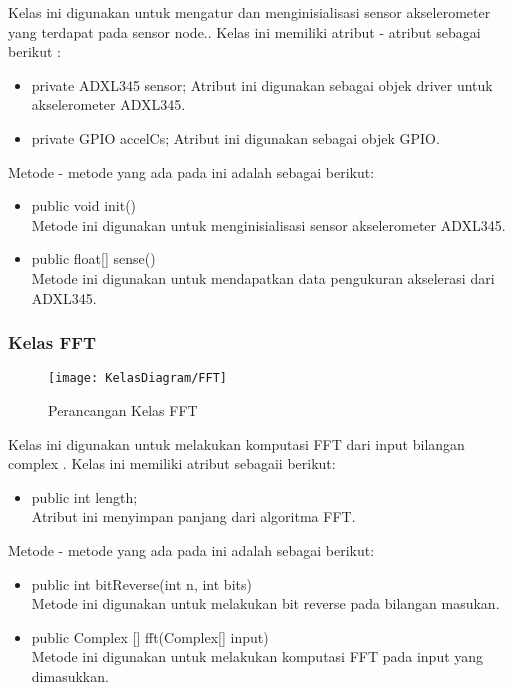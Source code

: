 Kelas ini digunakan untuk mengatur dan menginisialisasi sensor akselerometer yang terdapat pada sensor node.. Kelas ini memiliki atribut - atribut sebagai berikut :
\begin{itemize}
	\item private ADXL345 sensor;
		Atribut ini digunakan sebagai objek driver untuk akselerometer ADXL345.
	\item private GPIO accelCs;
		Atribut ini digunakan sebagai objek GPIO.
\end{itemize}
Metode - metode yang ada pada ini adalah sebagai berikut:
\begin{itemize}
	\item public void init() \\
		Metode ini digunakan untuk menginisialisasi sensor akselerometer ADXL345.
	\item public float[] sense() \\
		Metode ini digunakan untuk mendapatkan data pengukuran akselerasi dari ADXL345.
\end{itemize}

\subsubsection{Kelas FFT}
\begin{figure}[H]
	\centering
	\texttt{[image: KelasDiagram/FFT]}  
	\caption[Perancangan Kelas FFT]{Perancangan Kelas FFT} 
	\label{fig:KelasFFT} 
\end{figure}

Kelas ini digunakan untuk melakukan komputasi FFT dari input bilangan complex . Kelas ini memiliki atribut sebagaii berikut:
\begin{itemize}
	\item public int length; \\
	Atribut ini menyimpan panjang dari algoritma FFT.
\end{itemize}
Metode - metode yang ada pada ini adalah sebagai berikut:
\begin{itemize}
	\item public int bitReverse(int n, int bits) \\
		Metode ini digunakan untuk melakukan bit reverse pada bilangan masukan. 
	\item public Complex [] fft(Complex[] input) \\
		Metode ini digunakan untuk melakukan komputasi FFT pada input yang dimasukkan. 
\end{itemize}


